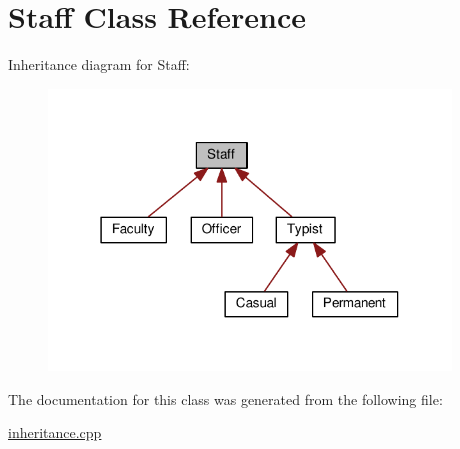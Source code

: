 \hypertarget{class_staff}{}\section{Staff Class Reference}
\label{class_staff}


Inheritance diagram for Staff\+:
\nopagebreak
\begin{figure}[H]
\begin{center}
\leavevmode
\includegraphics[width=303pt]{class_staff__inherit__graph}
\end{center}
\end{figure}


The documentation for this class was generated from the following file\+:\begin{DoxyCompactItemize}
\item 
\hyperlink{inheritance_8cpp}{inheritance.\+cpp}\end{DoxyCompactItemize}
